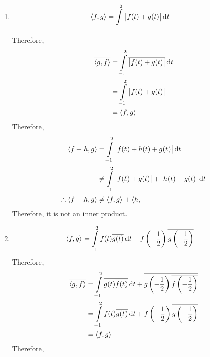 \documentclass[fleqn, a4paper, 11pt, oneside]{amsart}
\theoremstyle{definition}
\theoremstyle{theorem}
\begin{document}
\begin{solution}
	\begin{enumerate}
		\item
			\begin{align*}
				\langle f,g \rangle & = \int\limits_{-1}^{2} \left| f(t) + g(t) \right| \dif t
			\end{align*}
			Therefore,
			\begin{align*}
				\overline{\langle g,f \rangle} & = \int\limits_{-1}^{2} \overline{\left| f(t) + g(t) \right|} \dif t \\
                                                               & = \int\limits_{-1}^{2} \left| f(t) + g(t) \right|                   \\
                                                               & = \langle f,g \rangle
			\end{align*}
			Therefore,
			\begin{align*}
				\langle f + h , g \rangle            & = \int\limits_{-1}^{2} \left| f(t) + h(t) + g(t) \right| \dif t                          \\
                                                                     & \neq \int\limits_{-1}^{2} \left| f(t) + g(t) \right| + \left| h(t) + g(t) \right| \dif t \\
				\therefore \langle f + h , g \rangle & \neq \langle f,g \rangle + \langle h,
			\end{align*}
			Therefore, it is not an inner product.
		\item
			\begin{align*}
				\langle f,g \rangle & = \int\limits_{-1}^{2} f(t) \overline{g(t)} \dif t + f\left( -\frac{1}{2} \right) \overline{g\left( -\frac{1}{2} \right)}
			\end{align*}
			Therefore,
			\begin{align*}
				\overline{\langle g,f \rangle} & = \int\limits_{-1}^{2} \overline{g(t) \overline{f(t)}} \dif t + \overline{g\left( -\frac{1}{2} \right) \overline{f\left( -\frac{1}{2} \right)}} \\
                                                               & = \int\limits_{-1}^{2} f(t) \overline{g(t)} \dif t + f\left( -\frac{1}{2} \right) \overline{g\left( -\frac{1}{2} \right)}                       \\
                                                               & = \langle f,g \rangle
			\end{align*}
			Therefore,
			\begin{align*}

\end{align*}
\end{enumerate}
\end{solution}
\end{document}
